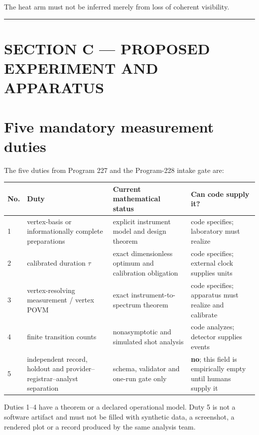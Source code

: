 \documentclass[11pt,a4paper,openany]{report}
\begin{document}
The heat arm must not be inferred merely from loss of coherent visibility.

\par\medskip\hrule\medskip

\chapter{SECTION C --- PROPOSED EXPERIMENT AND APPARATUS}

\chapter{Five mandatory measurement duties}

The five duties from Program 227 and the Program-228 intake gate are:

\begin{center}
\begingroup\small
\setlength{\tabcolsep}{3.5pt}
\renewcommand{\arraystretch}{1.16}
\begin{longtable}{@{}p{}p{}p{}p{}@{}}
\toprule
\textbf{No.} & \textbf{Duty} & \textbf{Current mathematical status} & \textbf{Can code supply it?} \\
\midrule
\endhead
1 & vertex-basis or informationally complete preparations & explicit instrument model and design theorem & code specifies; laboratory must realize \\
2 & calibrated duration \(\tau\) & exact dimensionless optimum and calibration obligation & code specifies; external clock supplies units \\
3 & vertex-resolving measurement /\allowbreak{} vertex POVM & exact instrument-to-spectrum theorem & code specifies; apparatus must realize and calibrate \\
4 & finite transition counts & nonasymptotic and simulated shot analysis & code analyzes; detector supplies events \\
5 & independent record, holdout and provider--registrar--analyst separation & schema, validator and one-run gate only & \textbf{no}; this field is empirically empty until humans supply it \\
\bottomrule
\end{longtable}
\endgroup
\end{center}

Duties 1--4 have a theorem or a declared operational model. Duty 5 is not a software artifact and must not be filled with synthetic data, a screenshot, a rendered plot or a record produced by the same analysis team.
\end{document}
